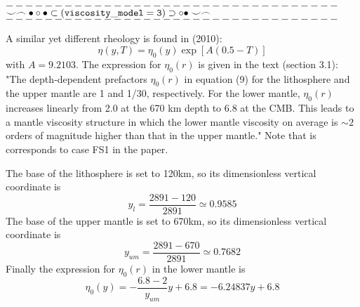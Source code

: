 \newpage
\begin{center}
$----------------------------------$\\
$\smile \frown \bullet \circ \bullet \subset ( {\tt viscosity\_model=3} ) \supset \circ \bullet \smile \frown$\\
$----------------------------------$
\end{center}


A similar yet different rheology is found in \textcite{zhzl10} (2010):
\[
\eta(y,T) = \eta_0(y) \exp [A(0.5-T)]
\]
with $A=9.2103$. The expression for $\eta_0(r)$ is given in the text (section 3.1):
"The depth‐dependent prefactors $\eta_0(r)$ in equation (9)
for the lithosphere and the upper mantle are 1 and 1/30,
respectively. For the lower mantle, $\eta_0(r)$ increases
linearly from 2.0 at the 670 km depth to 6.8 at the CMB. This
leads to a mantle viscosity structure in which the lower mantle
viscosity on average is $\sim 2$ orders of magnitude higher than
that in the upper mantle." Note that is corresponds to case FS1 in the paper. 

The base of the lithosphere is set to 120km, so its dimensionless
vertical coordinate is 
\[
y_l = \frac{2891-120}{2891} \simeq 0.9585
\] 
The base of the upper mantle is set to 670km, so its dimensionless
vertical coordinate is 
\[
y_{um} = \frac{2891-670}{2891} \simeq 0.7682
\] 
Finally the expression for $\eta_0(r)$ in the lower mantle 
is 
\[
\eta_0(y)= - \frac{6.8-2}{y_{um}} y + 6.8 = -6.24837 y + 6.8
\]

